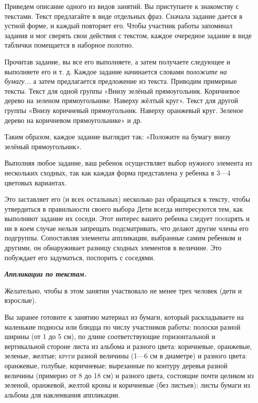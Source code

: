 \documentclass[a5paper]{book}
\renewcommand{\emph}[1]{\textit{#1}}
\begin{document}
Приведем описание одного из видов занятий. Вы приступаете к знакомству с
текстами. Текст предлагайте в виде отдельных фраз. Сначала задание
дается в устной форме, и каждый повторяет его. Чтобы участник работы
запоминал задания и мог сверять свои действия с текстом, каждое
очередное задание в виде таблички помещается в наборное полотно.

Прочитав задание, вы все его выполняете, а затем получаете следующее и
выполняете его и т. д. Каждое задание начинается словами \emph{положите
на бумагу...} а затем предлагается предложение из текста. Приводим
примерные тексты. Текст для одной группы «Внизу зелёный прямоугольник.
Коричневое дерево на зеленом прямоугольнике. Наверху жёлтый круг». Текст
для другой группы «Внизу коричневый прямоугольник. Наверху оранжевый
круг. Зеленое дерево на коричневом прямоугольнике» и др.

Таким образом, каждое задание выглядит так: «Положите на бумагу внизу
зелёный прямоугольник».

Выполняя любое задание, ваш ребенок осуществляет выбор нужного элемента
из нескольких сходных, так как каждая форма представлена у ребенка в
3---4 цветовых вариантах.

Это заставляет его (и всех остальных) несколько раз обращаться к тексту,
чтобы утвердиться в правильности своего выбора Дети всегда интересуются
тем, как выполняют задание их соседи. Этот интерес вашего ребенка
следует \textsc{поощ}рять и ни в коем случае нельзя запрещать
подсматривать, что делают другие члены его подгруппы. Сопоставляя
элементы аппликации, выбранные самим ребенком и другими, он обнаруживает
разницу сходных элементов в величине. Это побуждает его задуматься,
поспорить с соседями.

\emph{\textbf{Аппликации по текстам.}}

Желательно, чтобы в этом занятии участвовало не менее трех человек (дети
и взрослые).

Вы заранее готовите к занятию материал из бумаги, который раскладываете
на маленькие подносы или блюдца по числу участников работы: полоски
разной ширины (от 1 до 5 см), по длине соответствующие горизонтальной и
вертикальной стороне листа из альбома и разного цвета: коричневые,
оранжевые, зеленые, желтые; \textsc{круги} разной величины (1---6 см в
диаметре) и разного цвета: оранжевые, голубые, коричневые; вырезанные по
контуру деревья разной величины (примерно от 8 до 18 см) и разного
цвета, состоящие почти целиком из зеленой, оранжевой, желтой кроны и
коричневые (без листьев); листы бумаги из альбома для наклеивания
аппликации.
\end{document}
